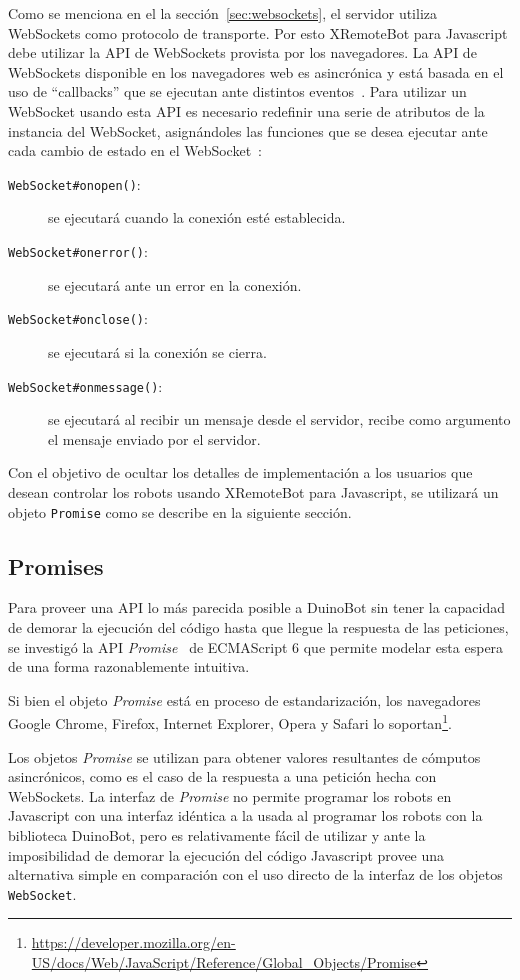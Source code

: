 Como se menciona en el la sección~\ref{sec:websockets}, el servidor
utiliza WebSockets como protocolo de transporte. Por esto XRemoteBot
para Javascript debe utilizar la API de WebSockets provista por
los navegadores.
La API de WebSockets disponible en los navegadores web es asincrónica y
está basada en el uso de ``callbacks''
que se ejecutan ante distintos eventos~\citep{wang_2013}.
Para utilizar un WebSocket usando esta API es necesario
redefinir una serie de atributos de la instancia del WebSocket,
asignándoles las funciones que se
desea ejecutar ante cada cambio de estado en el
WebSocket~\citep{websocket_2014}:
\begin{description}
    \item[\texttt{WebSocket\#onopen()}:] se ejecutará cuando
    la conexión esté establecida.
    \item[\texttt{WebSocket\#onerror()}:] se ejecutará ante un error en
    la conexión.
    \item[\texttt{WebSocket\#onclose()}:] se ejecutará si la conexión
    se cierra.
    \item[\texttt{WebSocket\#onmessage()}:] se ejecutará al recibir un
    mensaje desde el servidor, recibe como argumento el mensaje
    enviado por el servidor.
\end{description}


Con el objetivo de ocultar los detalles de implementación a los
usuarios que desean controlar los robots usando XRemoteBot para
Javascript, se utilizará un objeto \texttt{Promise} como se
describe en la siguiente sección.

\subsection{Promises}\label{sec:promises}

Para proveer una API lo más parecida posible a DuinoBot sin
tener la capacidad de demorar la ejecución del código hasta que
llegue la respuesta de las peticiones, se investigó la API
\textit{Promise}~\citep{ECMA-262} de ECMAScript 6 que permite modelar
esta espera de una forma razonablemente intuitiva.

Si bien el objeto \textit{Promise} está en proceso de estandarización,
los navegadores Google Chrome, Firefox, Internet Explorer, Opera y Safari lo
soportan\footnote{\url{https://developer.mozilla.org/en-US/docs/Web/JavaScript/Reference/Global_Objects/Promise}}.

Los objetos \textit{Promise} se utilizan para obtener valores resultantes
de cómputos asincrónicos, como es el caso de la respuesta a una petición
hecha con WebSockets. La interfaz de \textit{Promise} no permite programar
los robots en Javascript con una interfaz idéntica a la usada al programar
los robots con la biblioteca DuinoBot, pero es relativamente fácil de
utilizar y ante la imposibilidad de demorar la ejecución del código
Javascript provee una alternativa
simple en comparación con el uso directo de la interfaz
de los objetos \texttt{WebSocket}.


